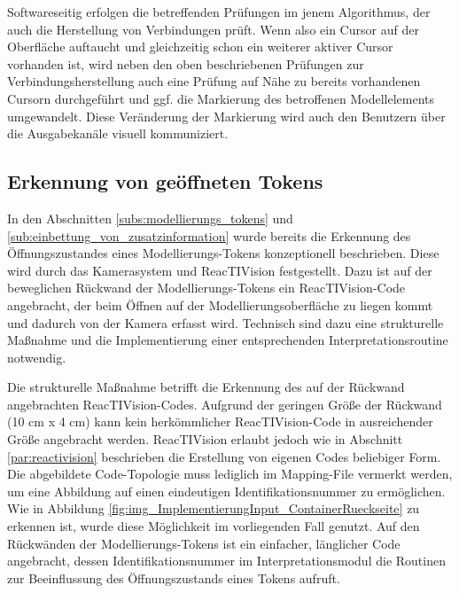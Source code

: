 Softwareseitig erfolgen die betreffenden Prüfungen im jenem Algorithmus, der auch die Herstellung von Verbindungen prüft. Wenn also ein Cursor auf der Oberfläche auftaucht und gleichzeitig schon ein weiterer aktiver Cursor vorhanden ist, wird neben den oben beschriebenen Prüfungen zur Verbindungsherstellung auch eine Prüfung auf Nähe zu bereits vorhandenen Cursorn durchgeführt und ggf. die Markierung des betroffenen Modellelements umgewandelt. Diese Veränderung der Markierung wird auch den Benutzern über die Ausgabekanäle visuell kommuniziert.


\subsection{Erkennung von geöffneten Tokens} %
\label{sub:erkennung_von_geöffneten_tokens}

In den Abschnitten \ref{subs:modellierungs_tokens} und \ref{sub:einbettung_von_zusatzinformation} wurde bereits die Erkennung des Öffnungszustandes eines Modellierungs-Tokens konzeptionell beschrieben. Diese wird durch das Kamerasystem und ReacTIVision festgestellt. Dazu ist auf der beweglichen Rückwand der Modellierungs-Tokens ein ReacTIVision-Code angebracht, der beim Öffnen auf der Modellierungsoberfläche zu liegen kommt und dadurch von der Kamera erfasst wird. Technisch sind dazu eine strukturelle Maßnahme und die Implementierung einer entsprechenden Interpretationsroutine notwendig.

Die strukturelle Maßnahme betrifft die Erkennung des auf der Rückwand angebrachten ReacTIVision-Codes. Aufgrund der geringen Größe der Rückwand (10 cm x 4 cm) kann kein herkömmlicher ReacTIVision-Code in ausreichender Größe angebracht werden. ReacTIVision erlaubt jedoch wie in Abschnitt \ref{par:reactivision} beschrieben die Erstellung von eigenen Codes beliebiger Form. Die abgebildete Code-Topologie muss lediglich im Mapping-File vermerkt werden, um eine Abbildung auf einen eindeutigen Identifikationsnummer zu ermöglichen. Wie in Abbildung \ref{fig:img_ImplementierungInput_ContainerRueckseite} zu erkennen ist, wurde diese Möglichkeit im vorliegenden Fall genutzt. Auf den Rückwänden der Modellierungs-Tokens ist ein einfacher, länglicher Code angebracht, dessen Identifikationsnummer im Interpretationsmodul die Routinen zur Beeinflussung des Öffnungszustands eines Tokens aufruft.

